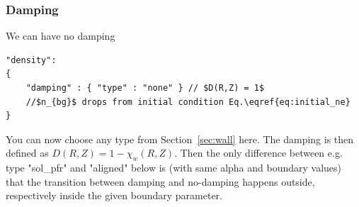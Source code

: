 \subsubsection{Damping} \label{sec:damping}
We can have no damping
\begin{verbatim}
"density":
{
    "damping" : { "type" : "none" } // $D(R,Z) = 1$
    //$n_{bg}$ drops from initial condition Eq.\eqref{eq:initial_ne}
}
\end{verbatim}
\begin{tcolorbox}[title=Recent Update]
You can now choose any type from Section~\ref{sec:wall} here.
The damping is then defined as $D(R,Z) = 1- \chi_w(R,Z)$.
Then the only difference between e.g. type "sol\_pfr" and "aligned" below is
(with same alpha and boundary values) that the
transition between damping and no-damping happens outside, respectively
inside the given boundary parameter.
\end{tcolorbox}

